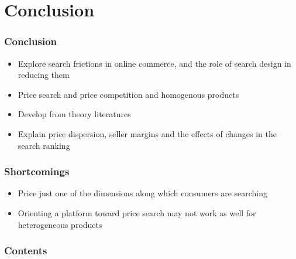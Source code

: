 \documentclass{beamer}
\begin{document}
\section{Conclusion}
\begin{frame}
\frametitle{Conclusion}
\begin{itemize}
\item Explore search frictions in online commerce, and the role of search design in reducing them
\item Price search and price competition and homogenous products
\item Develop from theory literatures 
\item Explain price dispersion, seller margins and the effects of changes in the search ranking
\end{itemize}
\end{frame}

\begin{frame}
\frametitle{Shortcomings}
\begin{itemize}
\item Price just one of the dimensions along which consumers are searching
\item Orienting a platform toward price search may not work as well for heterogeneous products
\end{itemize}
\end{frame}


\begin{frame}[plain]
\frametitle{Contents}
\begin{multicols}{2}
\tableofcontents
\end{multicols}
\end{frame}
\end{document}
